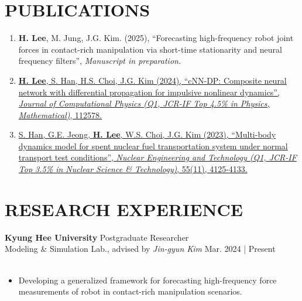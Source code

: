 \documentclass[a4paper,10pt]{extarticle}
\begin{document}
\section*{PUBLICATIONS}
\begin{enumerate}[leftmargin=.5cm]
	\item \textbf{H. Lee}, M. Jung, J.G. Kim. (2025), “Forecasting high-frequency robot joint forces in contact-rich manipulation via short-time stationarity and neural frequency filters”, \textsl{Manuscript in preparation.}
	\item \href{https://www.sciencedirect.com/science/article/pii/S0021999123006733?casa_token=ARUkhI8XI8YAAAAA:wTzCIauJvSlonWw-J-SlAFqPX6NZRQS-qBX59l4YN5O3caEppoglU0duVmMkZYf4nWYd7tm_D_E}{\textbf{H. Lee}, S. Han, H.S. Choi, J.G. Kim (2024), “cNN-DP: Composite neural network with differential propagation for impulsive nonlinear dynamics”, \textit{Journal of Computational Physics (Q1, JCR-IF Top 4.5\% in Physics, Mathematical)}, 112578.}
	\item \href{https://www.google.com/url?sa=t&rct=j&q=&esrc=s&source=web&cd=&cad=rja&uact=8&ved=2ahUKEwij36zWpNKCAxXMMEQIHSBfBMUQFnoECBEQAQ&url=https%3A%2F%2Fwww.sciencedirect.com%2Fscience%2Farticle%2Fpii%2FS1738573323003492&usg=AOvVaw1zj_G3k5c77uhMNnmu0EEC&opi=89978449}{S. Han, G.E. Jeong, \textbf{H. Lee}, W.S. Choi, J.G. Kim (2023), “Multi-body dynamics model for spent nuclear fuel transportation system under normal transport test conditions”, \textit{Nuclear Engineering and Technology (Q1, JCR-IF Top 3.5\% in Nuclear Science \& Technology)}, 55(11), 4125-4133.}
\end{enumerate}


\section*{RESEARCH EXPERIENCE}
\noindent\textbf{Kyung Hee University} \hfill Postgraduate Researcher\\
Modeling \& Simulation Lab., advised by \textsl{Jin-gyun Kim} \hfill Mar. 2024 | Present\\
\vspace*{-0.25cm}\\
\begin{minipage}{0.75\textwidth}
	\small
	\begin{itemize}
		\item Developing a generalized framework for forecasting high-frequency force measurements of robot in contact-rich manipulation scenarios.
	\end{itemize}
\end{minipage}\\
\end{document}
